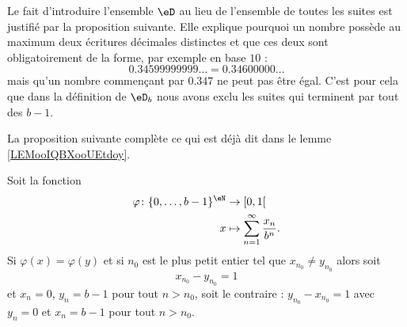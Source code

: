 Le fait d'introduire l'ensemble \( \eD\) au lieu de l'ensemble de toutes les suites est justifié par la proposition suivante. Elle explique pourquoi un nombre possède au maximum deux écritures décimales distinctes et que ces deux sont obligatoirement de la forme, par exemple en base \( 10\) :
\begin{equation}
	0.34599999999\ldots=0.34600000\ldots
\end{equation}
mais qu'un nombre commençant par \( 0.347\) ne peut pas être égal. C'est pour cela que dans la définition de \( \eD_b\) nous avons exclu les suites qui terminent par tout des \( b-1\).

La proposition suivante complète ce qui est déjà dit dans le lemme \ref{LEMooIQBXooUEtdoy}.
\begin{proposition} \label{PropSAOoofRlQR}
	Soit la fonction
	\begin{equation}
		\begin{aligned}
			\varphi\colon \{ 0,\ldots, b-1 \}^{\eN} & \to \mathopen[ 0 , 1 [                          \\
			x                                       & \mapsto \sum_{n=1}^{\infty}\frac{ x_n }{ b^n }.
		\end{aligned}
	\end{equation}
	Si \( \varphi(x)=\varphi(y)\) et si \( n_0\) est le plus petit entier tel que \( x_{n_0}\neq y_{n_0}\) alors soit
	\begin{equation}
		x_{n_0}-y_{n_0}=1
	\end{equation}
	et \( x_n=0\), \( y_n=b-1\) pour tout \( n>n_0\), soit le contraire : \( y_{n_0}-x_{n_0}=1\) avec \( y_n=0\) et \( x_n=b-1\) pour tout \( n>n_0\).
\end{proposition}

